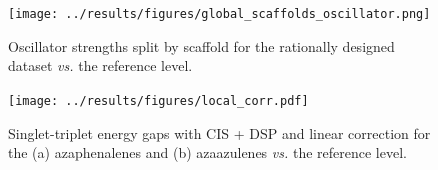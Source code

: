 \documentclass[
  number,
  3p]{elsarticle}
\begin{document}
\begin{figure}

{\centering \texttt{[image: ../results/figures/global\_scaffolds\_oscillator.png]}

}

\caption{\label{fig-global-scaffolds-oscillator}Oscillator strengths
split by scaffold for the rationally designed dataset \emph{vs.} the
reference level.}

\end{figure}

\begin{figure}

{\centering \texttt{[image: ../results/figures/local\_corr.pdf]}

}

\caption{\label{fig-local-corr}Singlet-triplet energy gaps with CIS +
DSP and linear correction for the (a) azaphenalenes and (b) azaazulenes
\emph{vs.} the reference level.}

\end{figure}
\end{document}
